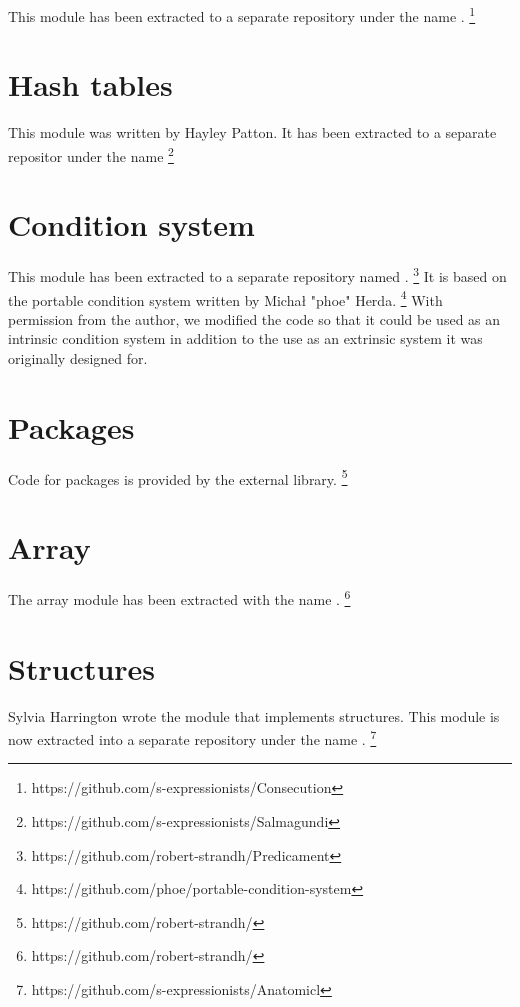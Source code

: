 This module has been extracted to a separate repository under the name
\consecution{}.%
\footnote{https://github.com/s-expressionists/Consecution}

\section{Hash tables}
\label{sec-hash-tables}

This module was written by Hayley Patton.  It has been extracted to a
separate repositor under the name \salmagundi{}%
\footnote{https://github.com/s-expressionists/Salmagundi}

\section{Condition system}
\label{sec-condition-system}

This module has been extracted to a separate repository named
\predicament{}.%
\footnote{https://github.com/robert-strandh/Predicament}
It is based on the portable condition system written by Michał "phoe"
Herda.%
\footnote{https://github.com/phoe/portable-condition-system}
With permission from the author, we modified the code so that it could
be used as an intrinsic condition system in addition to the use as an
extrinsic system it was originally designed for.

\section{Packages}
\label{sec-packages}

Code for packages is provided by the \parcl{} external library.%
\footnote{https://github.com/robert-strandh/\parcl{}}

\section{Array}
\label{sec-array}

The array module has been extracted with the name \regalia{}.%
\footnote{https://github.com/robert-strandh/\regalia{}}

\section{Structures}
\label{sec-structures}

Sylvia Harrington wrote the \sysname{} module that implements
structures.  This module is now extracted into a separate repository
under the name \anatomicl{}.%
\footnote{https://github.com/s-expressionists/Anatomicl}

